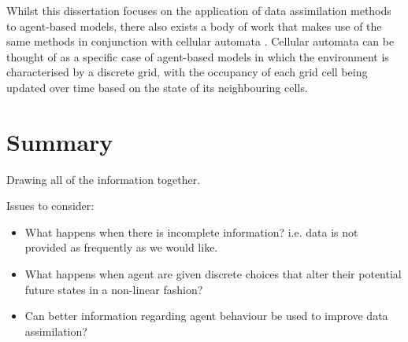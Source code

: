 Whilst this dissertation focuses on the application of data assimilation methods
to agent-based models, there also exists a body of work that makes use of the
same methods in conjunction with cellular automata \citep{li2012assimilating,
li2017exploring}.
Cellular automata can be thought of as a specific case of agent-based models in
which the environment is characterised by a discrete grid, with the occupancy of
each grid cell being updated over time based on the state of its neighbouring
cells.



\section{Summary}\label{sec:lit_rev:summary}

Drawing all of the information together.

Issues to consider:
\begin{itemize}
    \item What happens when there is incomplete information? i.e. data is not
        provided as frequently as we would like.
    \item What happens when agent are given discrete choices that alter their
        potential future states in a non-linear fashion?
    \item Can better information regarding agent behaviour be used to improve
        data assimilation?
\end{itemize}
